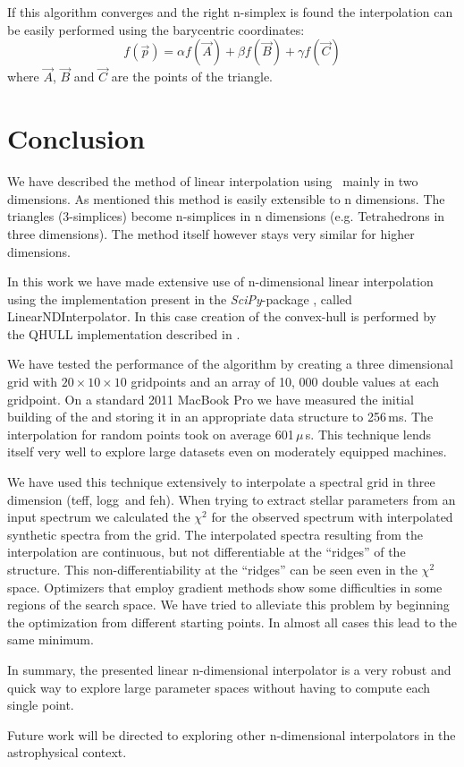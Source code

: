 If this algorithm converges and the right n-simplex is found the interpolation can be easily performed using the barycentric coordinates:
\[
f(\vec{p})=\alpha f(\vec{A}) + \beta f(\vec{B}) + \gamma f(\vec{C})
\]
where  $\vec{A}$, $\vec{B}$ and $\vec{C}$ are the points of the triangle. 


\section{Conclusion}

We have described the method of linear interpolation using \deltri\ mainly in two dimensions. As mentioned this method is easily extensible to n dimensions. The triangles (3-simplices) become n-simplices in n dimensions (e.g. Tetrahedrons in three dimensions). The method itself however stays very similar for higher dimensions. 

In this work we have made extensive use of n-dimensional linear interpolation using the implementation present in the \textit{SciPy}-package \citescipy, called LinearNDInterpolator. In this case creation of the convex-hull is performed by the QHULL implementation described in \citet{Barber96thequickhull}.

We have tested the performance of the algorithm by creating a three dimensional grid with $20\times10\times10$ gridpoints and an array of 10, 000  double values at each gridpoint. 
On a standard 2011 MacBook Pro we have measured the initial building of the \deltri and storing it in an appropriate data structure to 256\,ms. The interpolation for random points took on average 601\,$\mu$\,s. This technique lends itself very well to explore large datasets even on moderately equipped machines. 

We have used this technique extensively to interpolate a spectral grid in three dimension (\gls{teff}, \gls{logg}\ and \gls{feh}). When trying to extract stellar parameters from an input spectrum we calculated the $\chi^2$ for the observed spectrum with interpolated synthetic spectra from the grid. The interpolated spectra resulting from the interpolation are continuous, but not differentiable at the ``ridges'' of the structure. This non-differentiability at the ``ridges'' can be seen even in the $\chi^2$ space. Optimizers that employ gradient methods \citep[such as MIGRAD][]{James:1975dr} show some difficulties in some regions of the search space. We have tried to alleviate this problem by beginning the optimization from different starting points. In almost all cases this lead to the same minimum.

In summary, the presented linear n-dimensional interpolator is a very robust and quick way to explore large parameter spaces without having to compute each single point. 

Future work will be directed to exploring other n-dimensional interpolators in the astrophysical context. 

